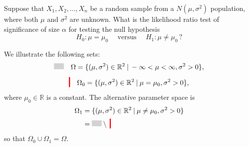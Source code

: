 \begin{example}
    Suppose that $X_1, X_2, \ldots, X_n$ be a random sample from a $N(\mu, \sigma^2)$ population, 
    where both $\mu$ and $\sigma^2$ are unknown. What is the likelihood ratio test of significance of size $\alpha$ for testing the null hypothesis 
    \[
        H_0 : \mu = \mu_0 \quad \text{ versus } \quad H_1 : \mu \neq \mu_0 \, ?
    \]
\end{example}
\begin{solution}
    We illustrate the following sets:
    \[
        \recticon{gray} \quad \Omega = \{ (\mu, \sigma^2) \in \mathbb{R}^2 \> | \> -\infty < \mu < \infty, \sigma^2 > 0 \},
    \]
    \[
        \vertl \quad \Omega_0 = \{ (\mu, \sigma^2) \in \mathbb{R}^2 \> | \> \mu = \mu_0, \sigma^2 > 0 \},
    \]
    where $\mu_0 \in \mathbb{R}$ is a constant. The alternative parameter space is
    \begin{align*}
        \Omega_1 &= \{ (\mu, \sigma^2) \in \mathbb{R}^2 \> | \> \mu \neq \mu_0, \sigma^2 > 0 \}\\
        &= \recticon{gray} \setminus \> \vertl
    \end{align*}
    so that $\Omega_0 \cup \Omega_1 = \Omega$.


\end{solution}
